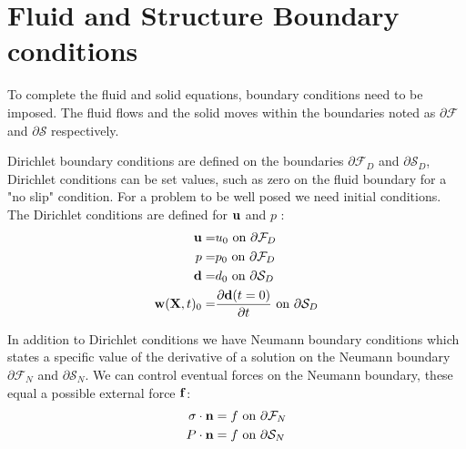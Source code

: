 \section{Fluid and Structure Boundary conditions}
To complete the fluid and solid equations, boundary conditions need to be imposed. The fluid flows and the solid moves within the boundaries noted as $ \partial\mathcal{F}$ and $ \partial \mathcal{S}$ respectively. 

Dirichlet boundary conditions are defined on the boundaries $ \partial \mathcal{F}_D$ and $ \partial \mathcal{S}_D$,
Dirichlet conditions can be set values, such as zero on the fluid boundary for a "no slip" condition. For a problem to be well posed we need initial conditions.
The Dirichlet conditions are defined for $\bold{u}$ and $p$ :
\begin{align}
\bold{u} =& u_0 \text{   on   } \partial \mathcal{F}_D  \\
p =& p_0 \text{   on   } \partial \mathcal{F}_D  \\
\bold{d} =& d_0 \text{ on   } \partial \mathcal{S}_D  \\
\bold{w}(\textbf{X},t)_0 =& \frac{\partial \bold{d}(t=0)}{\partial t} \text{   on   } \partial \mathcal{S}_D   
\end{align}

In addition to Dirichlet conditions we have Neumann boundary conditions which states a specific value of the derivative of a solution on the Neumann boundary $\partial \mathcal{F}_N$ and $\partial \mathcal{S}_N$. We can control eventual forces on the Neumann boundary, these equal a possible external force $ \bold{f}$:
\begin{align}
\sigma \cdot \bold{n} &= f \text{   on   } \partial \mathcal{F}_N \\   
P\cdot \bold{n} &= f \text{   on   } \partial \mathcal{S}_N    
\end{align}
